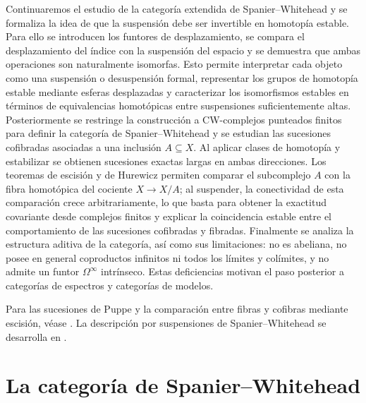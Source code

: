 Continuaremos el estudio de la categoría extendida de Spanier--Whitehead y se formaliza la idea de que la suspensión debe ser invertible en homotopía estable. Para ello se introducen los funtores de desplazamiento, se compara el desplazamiento del índice con la suspensión del espacio y se demuestra que ambas operaciones son naturalmente isomorfas. Esto permite interpretar cada objeto como una suspensión o desuspensión formal, representar los grupos de homotopía estable mediante esferas desplazadas y caracterizar los isomorfismos estables en términos de equivalencias homotópicas entre suspensiones suficientemente altas. Posteriormente se restringe la construcción a CW-complejos punteados finitos para definir la categoría de Spanier--Whitehead y se estudian las sucesiones cofibradas asociadas a una inclusión $A\subseteq X$. Al aplicar clases de homotopía y estabilizar se obtienen sucesiones exactas largas en ambas direcciones. Los teoremas de escisión y de Hurewicz permiten comparar el subcomplejo $A$ con la fibra homotópica del cociente $X\to X/A$; al suspender, la conectividad de esta comparación crece arbitrariamente, lo que basta para obtener la exactitud covariante desde complejos finitos y explicar la coincidencia estable entre el comportamiento de las sucesiones cofibradas y fibradas. Finalmente se analiza la estructura aditiva de la categoría, así como sus limitaciones: no es abeliana, no posee en general coproductos infinitos ni todos los límites y colímites, y no admite un funtor $\Omega^\infty$ intrínseco. Estas deficiencias motivan el paso posterior a categorías de espectros y categorías de modelos.

Para las sucesiones de Puppe y la comparación entre fibras y cofibras mediante escisión, véase \cite[cap.~8, \S\S4--7, y cap.~11, \S\S1--3]{may1999}. La descripción por suspensiones de Spanier--Whitehead se desarrolla en \cite[corolario~3.2.2.2 y \S4.2.2]{malkiewich}.

\section{La categoría de Spanier--Whitehead}

